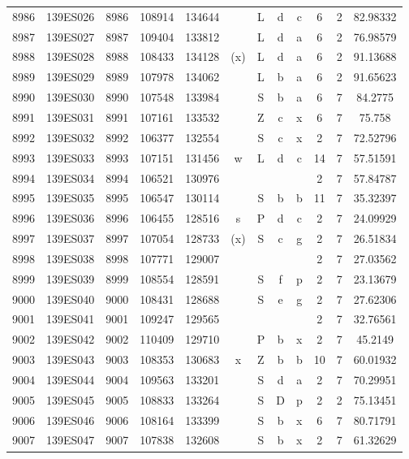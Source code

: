 \begin{tabular}{|*{12}{c|}}
8986 & 139ES026 & 8986 & 108914 & 134644 &  & L & d & c & 6 & 2 & 82.98332 \\ 
8987 & 139ES027 & 8987 & 109404 & 133812 &  & L & d & a & 6 & 2 & 76.98579 \\ 
8988 & 139ES028 & 8988 & 108433 & 134128 & (x) & L & d & a & 6 & 2 & 91.13688 \\ 
8989 & 139ES029 & 8989 & 107978 & 134062 &  & L & b & a & 6 & 2 & 91.65623 \\ 
8990 & 139ES030 & 8990 & 107548 & 133984 &  & S & b & a & 6 & 7 & 84.2775 \\ 
8991 & 139ES031 & 8991 & 107161 & 133532 &  & Z & c & x & 6 & 7 & 75.758 \\ 
8992 & 139ES032 & 8992 & 106377 & 132554 &  & S & c & x & 2 & 7 & 72.52796 \\ 
8993 & 139ES033 & 8993 & 107151 & 131456 & w & L & d & c & 14 & 7 & 57.51591 \\ 
8994 & 139ES034 & 8994 & 106521 & 130976 &  &  &  &  & 2 & 7 & 57.84787 \\ 
8995 & 139ES035 & 8995 & 106547 & 130114 &  & S & b & b & 11 & 7 & 35.32397 \\ 
8996 & 139ES036 & 8996 & 106455 & 128516 & s & P & d & c & 2 & 7 & 24.09929 \\ 
8997 & 139ES037 & 8997 & 107054 & 128733 & (x) & S & c & g & 2 & 7 & 26.51834 \\ 
8998 & 139ES038 & 8998 & 107771 & 129007 &  &  &  &  & 2 & 7 & 27.03562 \\ 
8999 & 139ES039 & 8999 & 108554 & 128591 &  & S & f & p & 2 & 7 & 23.13679 \\ 
9000 & 139ES040 & 9000 & 108431 & 128688 &  & S & e & g & 2 & 7 & 27.62306 \\ 
9001 & 139ES041 & 9001 & 109247 & 129565 &  &  &  &  & 2 & 7 & 32.76561 \\ 
9002 & 139ES042 & 9002 & 110409 & 129710 &  & P & b & x & 2 & 7 & 45.2149 \\ 
9003 & 139ES043 & 9003 & 108353 & 130683 & x & Z & b & b & 10 & 7 & 60.01932 \\ 
9004 & 139ES044 & 9004 & 109563 & 133201 &  & S & d & a & 2 & 7 & 70.29951 \\ 
9005 & 139ES045 & 9005 & 108833 & 133264 &  & S & D & p & 2 & 2 & 75.13451 \\ 
9006 & 139ES046 & 9006 & 108164 & 133399 &  & S & b & x & 6 & 7 & 80.71791 \\ 
9007 & 139ES047 & 9007 & 107838 & 132608 &  & S & b & x & 2 & 7 & 61.32629 \\ 

\end{tabular}
